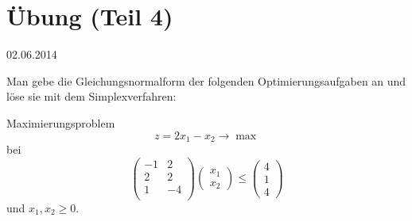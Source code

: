 
\section{Übung (Teil 4)}\hfill{02.06.2014}

\begin{exercise}
    Man gebe die Gleichungsnormalform der folgenden Optimierungsaufgaben an und löse sie mit dem Simplexverfahren:
    \begin{tasks}
        \item Maximierungsproblem
        $$
        z = 2x_1 -x_2 \to \max
        $$
        bei
        $$
        \begin{pmatrix}
            -1 & 2\\
            2 & 2\\
            1 & -4\\
        \end{pmatrix}
        \begin{pmatrix}
            x_1\\
            x_2
        \end{pmatrix}
        \leq
        \begin{pmatrix}
            4\\
            1\\
            4
        \end{pmatrix}
        $$
        und $x_1,x_2\geq 0$.
        \item
    \end{tasks}
\end{exercise}

